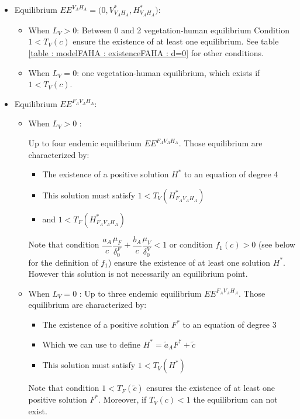 \documentclass{article}
\newcommand{\df}{\delta_0^F}
\newcommand{\dv}{\delta_0^V}
\begin{document}
\begin{itemize}
\item Equilibrium $EE^{V_AH_A} = \Big(0, V^*_{V_AH_A}, H^*_{V_AH_A}\Big)$:

\begin{itemize}
\item When $L_V > 0$: Between 0 and 2 vegetation-human equilibrium
 Condition $1 < T_V(c)$ ensure the existence of at least one equilibrium. See table \ref{table : modelFAHA : existenceFAHA : d=0} for other conditions.
 \item When $L_V = 0$: one vegetation-human equilibrium, which exists if $1 < T_V(c)$.
\end{itemize}

\item Equilibrium $EE^{F_AV_AH_A}$:

\begin{itemize}
\item When $L_V > 0$ : 

Up to four endemic equilibrium $EE^{F_AV_AH_A}$.
Those equilibrium are characterized by:
\begin{itemize}
\item The existence of a positive solution $H^*$ to an equation of degree 4
\item This solution must satisfy $1 < T_V(H^*_{F_AV_AH_A})$
\item and $1 < T_F(H^*_{F_AV_AH_A})$
\end{itemize}
Note that condition $\dfrac{a_A}{c}\dfrac{\mu_F}{\df} + \dfrac{b_A}{c}\dfrac{\mu_V}{\dv} < 1$ or condition $f_1(c) > 0$ (see below for the definition of $f_1$) ensure the existence of at least one solution $H^*$. However this solution is not necessarily an equilibrium point.

\item When $L_V = 0$ : 
Up to three endemic equilibrium $EE^{F_AV_AH_A}$.
Those equilibrium are characterized by:
\begin{itemize}
\item The existence of a positive solution $F^*$ to an equation of degree 3
\item Which we can use to define $H^* = \tilde{a}_A F^* + \tilde{c}$
\item This solution must satisfy $1 < T_V(H^*)$
\end{itemize}
Note that condition $1 < T_F(\tilde{c})$ ensures the existence of at least one positive solution $F^*$.
Moreover, if $T_V(c) < 1$ the equilibrium can not exist.

\end{itemize}
\end{itemize}
\end{document}
